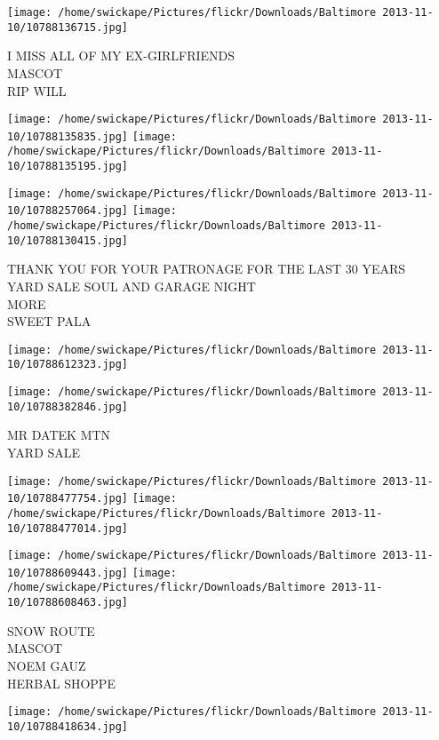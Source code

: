 \documentclass[10pt,letterpaper]{article}
\begin{document}
\vspace{0.25in}
\texttt{[image: /home/swickape/Pictures/flickr/Downloads/Baltimore 2013-11-10/10788136715.jpg]}

I MISS ALL OF MY EX{-}GIRLFRIENDS\\
MASCOT\\
RIP WILL\\
\pagebreak

\texttt{[image: /home/swickape/Pictures/flickr/Downloads/Baltimore 2013-11-10/10788135835.jpg]}
\texttt{[image: /home/swickape/Pictures/flickr/Downloads/Baltimore 2013-11-10/10788135195.jpg]}

\texttt{[image: /home/swickape/Pictures/flickr/Downloads/Baltimore 2013-11-10/10788257064.jpg]}
\texttt{[image: /home/swickape/Pictures/flickr/Downloads/Baltimore 2013-11-10/10788130415.jpg]}

THANK YOU FOR YOUR PATRONAGE FOR THE LAST 30 YEARS\\
YARD SALE SOUL AND GARAGE NIGHT\\
MORE\\
SWEET PALA\\
\pagebreak

\texttt{[image: /home/swickape/Pictures/flickr/Downloads/Baltimore 2013-11-10/10788612323.jpg]}

\vspace{0.25in}
\texttt{[image: /home/swickape/Pictures/flickr/Downloads/Baltimore 2013-11-10/10788382846.jpg]}

MR DATEK MTN\\
YARD SALE\\
\pagebreak

\texttt{[image: /home/swickape/Pictures/flickr/Downloads/Baltimore 2013-11-10/10788477754.jpg]}
\texttt{[image: /home/swickape/Pictures/flickr/Downloads/Baltimore 2013-11-10/10788477014.jpg]}

\texttt{[image: /home/swickape/Pictures/flickr/Downloads/Baltimore 2013-11-10/10788609443.jpg]}
\texttt{[image: /home/swickape/Pictures/flickr/Downloads/Baltimore 2013-11-10/10788608463.jpg]}

SNOW ROUTE\\
MASCOT\\
NOEM GAUZ\\
HERBAL SHOPPE\\
\pagebreak

\texttt{[image: /home/swickape/Pictures/flickr/Downloads/Baltimore 2013-11-10/10788418634.jpg]}
\end{document}
